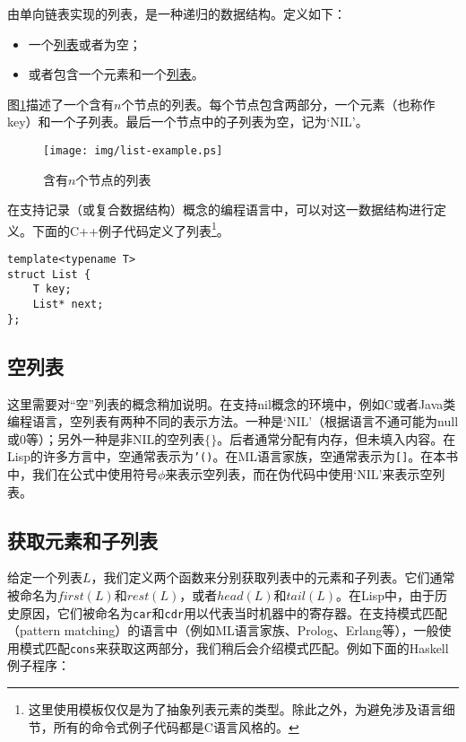 \documentclass[UTF8]{article}
\begin{document}
由单向链表实现的列表，是一种递归的数据结构。定义如下：

\begin{itemize}
\item 一个\underline{列表}或者为空；
\item 或者包含一个元素和一个\underline{列表}。
\end{itemize}

图\ref{fig:list-example}描述了一个含有$n$个节点的列表。每个节点包含两部分，一个元素（也称作key）和一个子列表。最后一个节点中的子列表为空，记为‘NIL’。

\begin{figure}[htbp]
  \centering
  \texttt{[image: img/list-example.ps]}
  \caption{含有$n$个节点的列表} \label{fig:list-example}
\end{figure}

在支持记录（或复合数据结构）概念的编程语言中，可以对这一数据结构进行定义。下面的C++例子代码定义了列表\footnote{这里使用模板仅仅是为了抽象列表元素的类型。除此之外，为避免涉及语言细节，所有的命令式例子代码都是C语言风格的。}。

\lstset{language=C++}
\begin{lstlisting}
template<typename T>
struct List {
    T key;
    List* next;
};
\end{lstlisting}

\subsection{空列表}

这里需要对“空”列表的概念稍加说明。在支持nil概念的环境中，例如C或者Java类编程语言，空列表有两种不同的表示方法。一种是‘NIL’（根据语言不通可能为null或0等）；另外一种是非NIL的空列表$\{ \}$。后者通常分配有内存，但未填入内容。在Lisp的许多方言中，空通常表示为\texttt{'()}。在ML语言家族，空通常表示为\texttt{[]}。在本书中，我们在公式中使用符号$\phi$来表示空列表，而在伪代码中使用‘NIL’来表示空列表。

\subsection{获取元素和子列表}

给定一个列表$L$，我们定义两个函数来分别获取列表中的元素和子列表。它们通常被命名为$first(L)$和$rest(L)$，或者$head(L)$和$tail(L)$。在Lisp中，由于历史原因，它们被命名为\texttt{car}和\texttt{cdr}用以代表当时机器中的寄存器\cite{SICP}。在支持模式匹配（pattern matching）的语言中（例如ML语言家族、Prolog、Erlang等），一般使用模式匹配\texttt{cons}来获取这两部分，我们稍后会介绍模式匹配。例如下面的Haskell例子程序：
\end{document}
